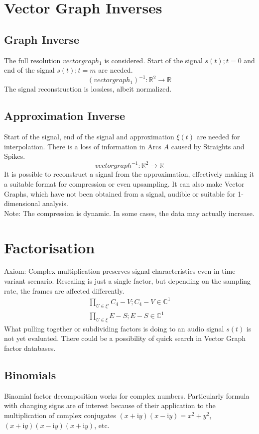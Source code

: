 \documentclass{report}
\begin{document}
\chapter{Vector Graph Inverses}
\section{Graph Inverse}
The full resolution $vectorgraph_{1}$ is considered. Start of the signal $s(t);t=0$ and end of the signal $s(t);t=m$ are needed.
\begin{equation}
(vectorgraph_{1})^{-1}: \mathbb{R}^2 \rightarrow \mathbb{R}
\end{equation}
The signal reconstruction is lossless, albeit normalized.
\section{Approximation Inverse}
Start of the signal, end of the signal and approximation $\xi(t)$ are needed for interpolation. There is a loss of information in Arcs $A$ caused by Straights and Spikes.
\begin{equation}
vectorgraph^{-1}: \mathbb{R}^2 \rightarrow \mathbb{R}
\end{equation}
It is possible to reconstruct a signal from the approximation, effectively making it a suitable format for compression or even upsampling. It can also make Vector Graphs, which have not been obtained from a signal, audible or suitable for 1-dimensional analysis.\\
Note: The compression is dynamic. In some cases, the data may actually increase.

\chapter{Factorisation}
Axiom: Complex multiplication preserves signal characteristics even in time-variant scenario. Rescaling is just a single factor, but depending on the sampling rate, the frames are affected differently.
\begin{align}
\prod \limits _{U \in \xi'} C_{4}-V;C_{4}-V \in \mathbb{C}^1\\
\prod \limits _{U \in \xi} E-S;E-S \in \mathbb{C}^1
\end{align}
What pulling together or subdividing factors is doing to an audio signal $s(t)$ is not yet evaluated. There could be a possibility of quick search in Vector Graph factor databases.
\section{Binomials}
Binomial factor decomposition works for complex numbers. Particularly formula with changing signs are of interest because of their application to the multiplication of complex conjugates $(x+\mathrm{i}y)(x-\mathrm{i}y)=x^2+y^2$, $(x+\mathrm{i}y)(x-\mathrm{i}y)(x+\mathrm{i}y)$, etc.
\end{document}
